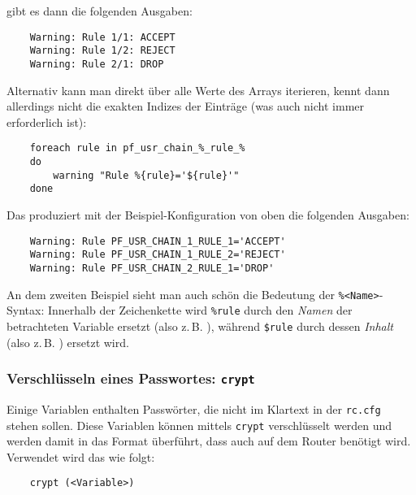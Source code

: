     gibt es dann die folgenden Ausgaben:

\begin{example}
\begin{verbatim}
    Warning: Rule 1/1: ACCEPT
    Warning: Rule 1/2: REJECT
    Warning: Rule 2/1: DROP
\end{verbatim}
\end{example}

    Alternativ kann man direkt über alle Werte des Arrays iterieren, kennt dann
    allerdings nicht die exakten Indizes der Einträge (was auch nicht immer
    erforderlich ist):

\begin{example}
\begin{verbatim}
    foreach rule in pf_usr_chain_%_rule_%
    do
        warning "Rule %{rule}='${rule}'"
    done
\end{verbatim}
\end{example}

    Das produziert mit der Beispiel-Konfiguration von oben die folgenden
    Ausgaben:

\begin{example}
\begin{verbatim}
    Warning: Rule PF_USR_CHAIN_1_RULE_1='ACCEPT'
    Warning: Rule PF_USR_CHAIN_1_RULE_2='REJECT'
    Warning: Rule PF_USR_CHAIN_2_RULE_1='DROP'
\end{verbatim}
\end{example}

    An dem zweiten Beispiel sieht man auch schön die Bedeutung der
    \texttt{\%{<Name>}}-Syntax: Innerhalb der Zeichenkette wird
    \texttt{\%{rule}} durch den \emph{Namen} der betrachteten Variable ersetzt
    (also z.\,B. ), während \texttt{\${rule}}
    durch dessen \emph{Inhalt} (also z.\,B. ) ersetzt wird.

\subsubsection{Verschlüsseln eines Passwortes: \texttt{crypt}}

Einige Variablen enthalten Passwörter, die nicht im Klartext in der
\texttt{rc.cfg} stehen sollen. Diese Variablen können mittels \texttt{crypt}
verschlüsselt werden und werden damit in das Format überführt, dass
auch auf dem Router benötigt wird. Verwendet wird das wie folgt:

\begin{example}
\begin{verbatim}
    crypt (<Variable>)
\end{verbatim}
\end{example}

